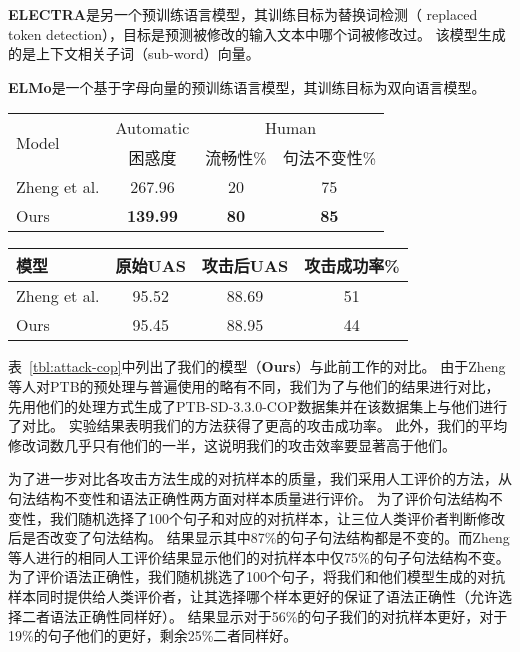 \textbf{ELECTRA}\cite{clark2020electra}是另一个预训练语言模型，其训练目标为替换词检测（ replaced token detection），目标是预测被修改的输入文本中哪个词被修改过。
该模型生成的是上下文相关子词（sub-word）向量。

\textbf{ELMo}\cite{peters2018deep}是一个基于字母向量的预训练语言模型，其训练目标为双向语言模型。 

\begin{table}[h]
    \vspace{0.5em}\centering\wuhao
	\begin{tabular}{lccc}
		\toprule[1.5pt]
		\multirow{2}{*}{Model}& Automatic & \multicolumn{2}{c}{Human} \\
		\cmidrule(r){2-2} \cmidrule(r){3-4}
		& 困惑度 &  流畅性\% & 句法不变性\%  \\
		\midrule[1pt]
		Zheng et al. & 267.96 & 20 & 75 \\
		Ours &\bf 139.99 &\bf 80 &\bf 85  \\
		\bottomrule[1.5pt]
	\end{tabular}
\end{table}

\begin{table}[h]
    \vspace{0.5em}\centering\wuhao
	\begin{tabular}{lccc}
		\toprule[1.5pt]
		模型& 原始UAS & 攻击后UAS & 攻击成功率\% \\
		\midrule[1pt]
		Zheng et al. & 95.52 & 88.69 & 51 \\
		Ours & 95.45 & 88.95 &  44 \\
		\bottomrule[1.5pt]
	\end{tabular}
\end{table}

表~\ref{tbl:attack-cop}中列出了我们的模型（\textbf{Ours}）与此前工作的对比。
由于Zheng等人对PTB的预处理与普遍使用的略有不同，我们为了与他们的结果进行对比，先用他们的处理方式生成了PTB-SD-3.3.0-COP数据集并在该数据集上与他们进行了对比。
实验结果表明我们的方法获得了更高的攻击成功率。
此外，我们的平均修改词数几乎只有他们的一半，这说明我们的攻击效率要显著高于他们。

为了进一步对比各攻击方法生成的对抗样本的质量，我们采用人工评价的方法，从句法结构不变性和语法正确性两方面对样本质量进行评价。
为了评价句法结构不变性，我们随机选择了100个句子和对应的对抗样本，让三位人类评价者判断修改后是否改变了句法结构。
结果显示其中87\%的句子句法结构都是不变的。而Zheng等人进行的相同人工评价结果显示他们的对抗样本中仅75\%的句子句法结构不变。
为了评价语法正确性，我们随机挑选了100个句子，将我们和他们模型生成的对抗样本同时提供给人类评价者，让其选择哪个样本更好的保证了语法正确性（允许选择二者语法正确性同样好）。
结果显示对于56\%的句子我们的对抗样本更好，对于19\%的句子他们的更好，剩余25\%二者同样好。

